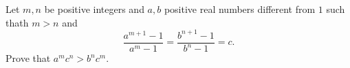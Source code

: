 Let $m, n$ be positive integers and $a, b$ positive real numbers different from  $1$ such thath $m > n$ and$$\frac{a^{m+1}-1}{a^m-1} = \frac{b^{n+1}-1}{b^n-1} = c.$$ Prove that  $a^m c^n > b^n c^{m}$.
